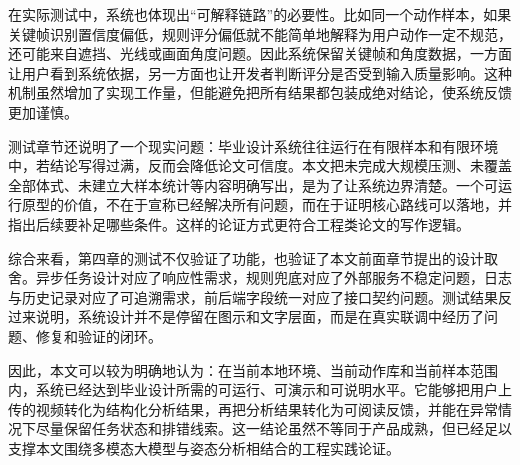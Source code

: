 在实际测试中，系统也体现出“可解释链路”的必要性。比如同一个动作样本，如果关键帧识别置信度偏低，规则评分偏低就不能简单地解释为用户动作一定不规范，还可能来自遮挡、光线或画面角度问题。因此系统保留关键帧和角度数据，一方面让用户看到系统依据，另一方面也让开发者判断评分是否受到输入质量影响。这种机制虽然增加了实现工作量，但能避免把所有结果都包装成绝对结论，使系统反馈更加谨慎。

测试章节还说明了一个现实问题：毕业设计系统往往运行在有限样本和有限环境中，若结论写得过满，反而会降低论文可信度。本文把未完成大规模压测、未覆盖全部体式、未建立大样本统计等内容明确写出，是为了让系统边界清楚。一个可运行原型的价值，不在于宣称已经解决所有问题，而在于证明核心路线可以落地，并指出后续要补足哪些条件。这样的论证方式更符合工程类论文的写作逻辑。

综合来看，第四章的测试不仅验证了功能，也验证了本文前面章节提出的设计取舍。异步任务设计对应了响应性需求，规则兜底对应了外部服务不稳定问题，日志与历史记录对应了可追溯需求，前后端字段统一对应了接口契约问题。测试结果反过来说明，系统设计并不是停留在图示和文字层面，而是在真实联调中经历了问题、修复和验证的闭环。

因此，本文可以较为明确地认为：在当前本地环境、当前动作库和当前样本范围内，系统已经达到毕业设计所需的可运行、可演示和可说明水平。它能够把用户上传的视频转化为结构化分析结果，再把分析结果转化为可阅读反馈，并能在异常情况下尽量保留任务状态和排错线索。这一结论虽然不等同于产品成熟，但已经足以支撑本文围绕多模态大模型与姿态分析相结合的工程实践论证。

